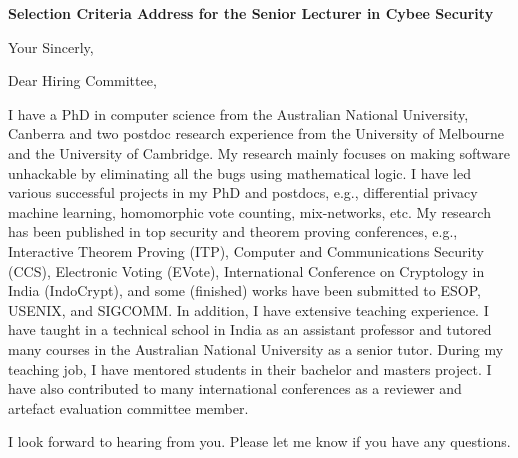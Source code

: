 \documentclass[11pt,a4paper,roman]{moderncv}
\begin{document}
\date{}
\opening{\textbf{Selection Criteria Address for the Senior Lecturer 
in Cybee Security}}
\closing{Your Sincerly, \vspace{-1em}}



\makelettertitle

Dear Hiring Committee, 

I have a PhD in computer science from the Australian National University, 
Canberra and two postdoc research experience from the University of 
Melbourne and the University of Cambridge. My research 
mainly focuses on making software unhackable by eliminating all 
the bugs using mathematical logic. I have led various successful projects
in my PhD and postdocs, e.g., differential privacy machine learning, 
homomorphic vote counting, mix-networks, etc.  My research has been 
published in top security and theorem proving conferences, e.g., 
Interactive Theorem Proving (ITP), 
Computer and Communications Security (CCS), Electronic Voting (EVote), 
International Conference on Cryptology in India (IndoCrypt),
and some (finished) works have been submitted to ESOP, USENIX, and SIGCOMM. 
In addition, I have extensive teaching experience. I have taught in 
a technical school in India as an assistant professor and tutored 
many courses in the Australian National University as a senior tutor.
During my teaching job, I have mentored students in their bachelor and 
masters project. I have also contributed to many international conferences 
as a reviewer and artefact evaluation committee member.



I look forward to hearing from you. Please let me know if you have any questions. \\
 


\makeletterclosing
\end{document}
